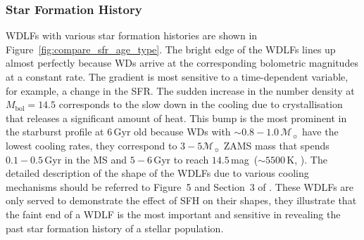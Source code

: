 \documentclass[fleqn,usenatbib]{rasti}
\newcommand{\msun}{\mathcal{M}_{\sun}}
\begin{document}
\subsubsection{Star Formation History}
WDLFs with various star formation histories are shown in
Figure~\ref{fig:compare_sfr_age_type}. The bright edge of the WDLFs lines up
almost perfectly because WDs arrive at the corresponding bolometric magnitudes
at a constant rate. The gradient is most sensitive to a time-dependent
variable, for example, a change in the SFR. The sudden increase in the number
density at $M_\mathrm{bol}=14.5$ corresponds to the slow down in the cooling
due to crystallisation that releases a significant amount of heat. This bump
is the most prominent in the starburst profile at $6$\,Gyr old because WDs
with $\sim0.8-1.0\,\msun$ have the lowest cooling rates, they correspond
to $3-5\msun$ ZAMS mass that spends $0.1-0.5$\,Gyr in the MS and $5-6$\,Gyr
to reach $14.5$\,mag~($\sim 5500$\,K, \citealp{2019ApJ...876...67B}). The
detailed description of the shape of the WDLFs due to various cooling
mechanisms should be referred to Figure~5 and Section~3
of \citep{2001PASP..113..409F}. These WDLFs are only served to demonstrate
the effect of SFH on their shapes, they illustrate that the faint end
of a WDLF is the most important and sensitive in revealing the past
star formation history of a stellar population.
\end{document}
